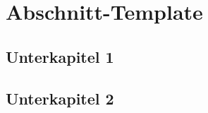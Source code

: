 \section{Abschnitt-Template}\label{sect:template}

\subsection{Unterkapitel 1}\label{sect:template.fstsub}

\subsection{Unterkapitel 2}\label{sect:template.sndsub}
